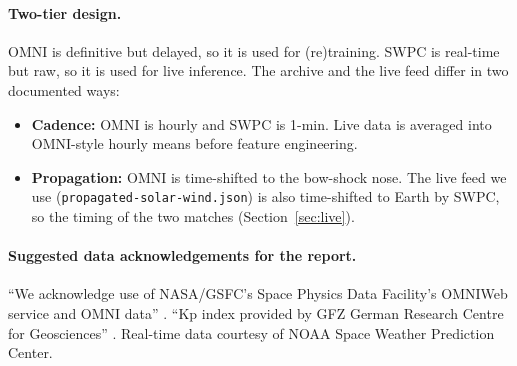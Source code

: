 \documentclass[11pt,a4paper]{article}
\newcommand{\code}[1]{\texttt{#1}}
\begin{document}
\paragraph{Two-tier design.} OMNI is definitive but delayed, so it is used for (re)training. SWPC is real-time
but raw, so it is used for live inference. The archive and the live feed differ in two documented ways:
\begin{itemize}
\item \textbf{Cadence:} OMNI is hourly and SWPC is 1-min. Live data is averaged into OMNI-style hourly means
before feature engineering.
\item \textbf{Propagation:} OMNI is time-shifted to the bow-shock nose. The live feed we use
(\code{propagated-solar-wind.json}) is also time-shifted to Earth by SWPC, so the timing of the two matches
(Section~\ref{sec:live}).
\end{itemize}

\paragraph{Suggested data acknowledgements for the report.}
``We acknowledge use of NASA/GSFC's Space Physics Data Facility's OMNIWeb service and OMNI data''
\cite{king2005}. ``Kp index provided by GFZ German Research Centre for Geosciences'' \cite{matzka2021}.
Real-time data courtesy of NOAA Space Weather Prediction Center.

\end{document}
